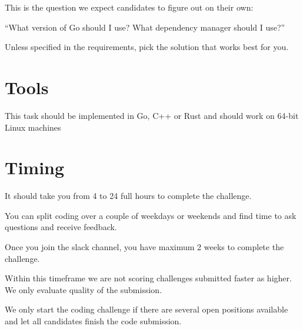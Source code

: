 \documentclass{article}
\begin{document}
This is the question we expect candidates to figure out on their own:

``What version of Go should I use? What dependency manager should I use?''

Unless specified in the requirements, pick the solution that works best for you.

\section{Tools}

This task should be implemented in Go, C++ or Rust and should work on 64-bit Linux machines

\section{Timing}

It should take you from 4 to 24 full hours to complete the challenge.

You can split coding over a couple of weekdays or weekends and find time to ask questions and receive feedback.

Once you join the slack channel, you have maximum 2 weeks to complete the challenge.

Within this timeframe we are not scoring challenges submitted faster as higher.
We only evaluate quality of the submission.

We only start the coding challenge if there are several open positions available and let
all candidates finish the code submission.
\end{document}
